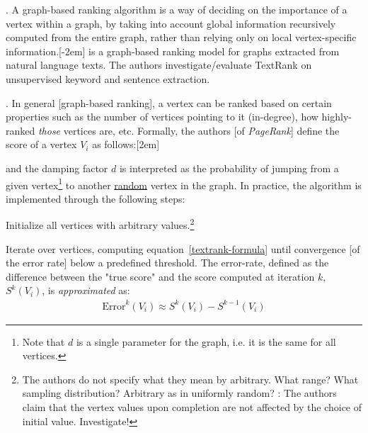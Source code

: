 \documentclass[11pt]{article}
\begin{document}

\myspace
\p {}. A graph-based ranking algorithm is a way of deciding on the importance of a vertex within a graph, by taking into account global information recursively computed from the entire graph, rather than relying only on local vertex-specific information.[-2em]  is a graph-based ranking model for graphs extracted from natural language texts. The authors investigate/evaluate TextRank on unsupervised keyword and sentence extraction.

\myspace
\p {}. In general [graph-based ranking], a vertex can be ranked based on certain properties such as the number of vertices pointing to it (in-degree), how highly-ranked \textit{those} vertices are, etc. Formally, the authors [of \textit{PageRank}] define the score of a vertex $V_i$ as follows:[2em]

 \label{textrank-formula}
and the damping factor $d$ is interpreted as the probability of jumping from a given vertex\footnote{Note that $d$ is a single parameter for the graph, i.e. it is the same for all vertices.} to another \underline{random} vertex in the graph. In practice, the algorithm is implemented through the following steps:
\begin{compactitem}
	\item[(1)] Initialize all vertices with arbitrary values.\footnote{The authors do not specify what they mean by arbitrary. What range? What sampling distribution? Arbitrary as in uniformly random? : The authors claim that the vertex values upon completion are not affected by the choice of initial value. Investigate!}
	
	\item[(2)] Iterate over vertices, computing equation~\ref{textrank-formula} until convergence [of the error rate] below a predefined threshold. The error-rate, defined as the difference between the "true score" and the score computed at iteration $k$, $S^k(V_i)$, is \textit{approximated} as:
	\begin{align}
		\textrm{Error}^k(V_i) \approx S^{k}(V_i) - S^{k - 1}(V_i)
	\end{align}
\end{compactitem}
\end{document}
